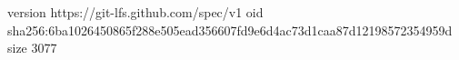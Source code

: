 version https://git-lfs.github.com/spec/v1
oid sha256:6ba1026450865f288e505ead356607fd9e6d4ac73d1caa87d12198572354959d
size 3077

